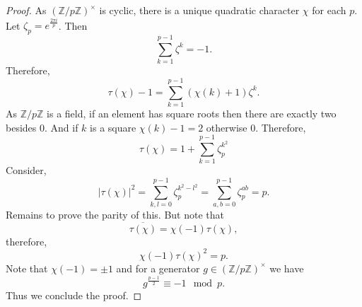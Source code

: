 \documentclass{article}
\newcommand{\Z}[0]{\mathbb{Z}}
\begin{document}
\begin{proof}
  As $(\Z/p\Z)^\times$ is cyclic, there is a unique quadratic character $\chi$ for each $p$. Let $\zeta_p = e^{{\frac {2\pi i} p}}$. Then 
  \begin{equation*}
    \sum_{k=1}^{p-1} \zeta^k = -1.
  \end{equation*}
  Therefore,
  \begin{equation*}
    \tau(\chi)-1 = \sum_{k=1}^{p-1}(\chi(k)+1)\zeta^k.
  \end{equation*}
  As $\Z/p\Z$ is a field, if an element has square roots then there are exactly two besides $0$. And if $k$ is a square $\chi(k)-1 = 2$ otherwise $0$. Therefore,
  \begin{equation*}
    \tau(\chi)=1+\sum_{k=1}^{p-1}\zeta_p^{k^2}
  \end{equation*}
  Consider,
  \begin{equation*}
    \vert\tau(\chi)\vert^2 = \sum_{k,l=0}^{p-1}\zeta_p^{k^2-l^2} = \sum_{a,b=0}^{p-1}\zeta_p^{ab} = p.
  \end{equation*}
  Remains to prove the parity of this. But note that 
  \begin{equation*}
    \overline{\tau(\chi)} = \chi(-1)\tau(\chi),
  \end{equation*}
  therefore,
  \begin{equation*}
    \chi(-1)\tau(\chi)^2 = p.
  \end{equation*}
  Note that $\chi(-1)=\pm1$ and for a generator $g\in(\Z/p\Z)^\times$ we have 
  \begin{equation*}
    g^{{\frac {p-1} 2}} \equiv -1\mod{p}.
  \end{equation*}
  Thus we conclude the proof.
\end{proof}
\end{document}
